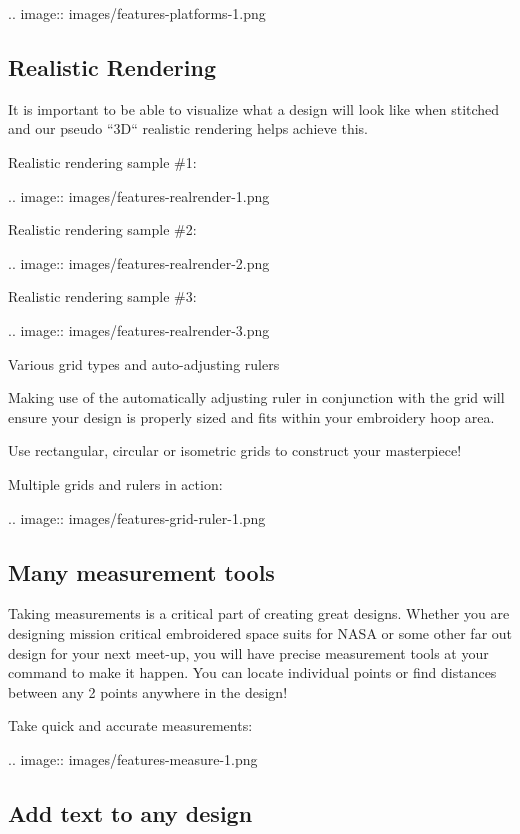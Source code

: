 \documentclass[11pt]{report}
\begin{document}
.. image::
   images/features-platforms-1.png

\subsection{Realistic Rendering}

It is important to be able to visualize what a design will look like when stitched and our pseudo ``3D`` realistic rendering helps achieve this.

Realistic rendering sample \#1:

.. image::
   images/features-realrender-1.png

Realistic rendering sample \#2:

.. image::
   images/features-realrender-2.png

Realistic rendering sample \#3:

.. image::
   images/features-realrender-3.png

Various grid types and auto-adjusting rulers

Making use of the automatically adjusting ruler in conjunction with the grid will ensure your design is properly sized and fits within your embroidery hoop area.

Use rectangular, circular or isometric grids to construct your masterpiece!

Multiple grids and rulers in action:

.. image::
   images/features-grid-ruler-1.png

\subsection{Many measurement tools}

Taking measurements is a critical part of creating great designs. Whether you are designing mission critical embroidered space suits for NASA or some other far out design for your next meet-up, you will have precise measurement tools at your command to make it happen. You can locate individual points or find distances between any 2 points anywhere in the design!

Take quick and accurate measurements:

.. image::
   images/features-measure-1.png

\subsection{Add text to any design}
\end{document}

